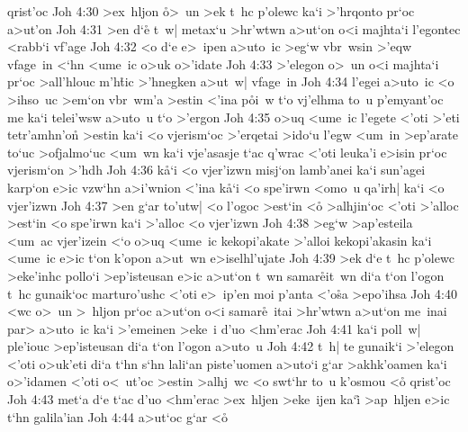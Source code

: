 qrist'oc\bibvsend
\vs Joh 4:30
>ex~hljon
\r{o}>~un
>ek
t~hc
p'olewc
ka`i
>'hrqonto
pr`oc
a>ut'on\bibvsend
\vs Joh 4:31
>en
d`e\r{}
t~w|
metax`u
>hr'wtwn
a>ut`on
o<i
majhta`i
l'egontec
<rabb`i
vf'age\bibvsend
\vs Joh 4:32
<o
d`e
e>~ipen
a>uto~ic
>eg`w
vbr~wsin
>'eqw
vfage~in
<`hn
<ume~ic
o>uk
o>'idate\bibvsend
\vs Joh 4:33
>'elegon
o>~un
o<i
majhta`i
pr`oc
>all'hlouc
m'h\r{t}ic
>'hnegken
a>ut~w|
vfage~in\bibvsend
\vs Joh 4:34
l'egei
a>uto~ic
<o
>ihso~uc
>em`on
vbr~wm'a
>estin
<'ina
p\r{o}i~w
t`o
vj'elhma
to~u
p'emyant'oc
me
ka`i
telei'wsw
a>uto~u
t`o
>'ergon\bibvsend
\vs Joh 4:35
o>uq
<ume~ic
l'egete
<'oti
>'eti
tetr'amhn'o\r{n}
>estin
ka`i
<o
vjerism`oc
>'erqetai
>ido`u
l'egw
<um~in
>ep'arate
to`uc
>ofjalmo`uc
<um~wn
ka`i
vje'asasje
t`ac
q'wrac
<'oti
leuka'i
e>isin
pr`oc
vjerism`on
>'hdh\bibvsend
\vs Joh 4:36
k\r{a}`i
<o
vjer'izwn
misj`on
lamb'anei
ka`i
sun'agei
karp`on
e>ic
vzw`hn
a>i'wnion
<'ina
k\r{a}`i
<o
spe'irwn
<omo~u
qa'irh|
ka`i
<o
vjer'izwn\bibvsend
\vs Joh 4:37
>en
g`ar
to'utw|
<o
l'ogoc
>est`in
<o\r{}
>alhjin`oc
<'oti
>'alloc
>est`in
<o
spe'irwn
ka`i
>'alloc
<o
vjer'izwn\bibvsend
\vs Joh 4:38
>eg`w
>ap'esteila
<um~ac
vjer'izein
<`o
o>uq
<ume~ic
kekopi'akate
>'alloi
kekopi'akasin
ka`i
<ume~ic
e>ic
t`on
k'opon
a>ut~wn
e>iselhl'ujate\bibvsend
\vs Joh 4:39
>ek
d`e
t~hc
p'olewc
>eke'inhc
pollo`i
>ep'isteusan
e>ic
a>ut`on
t~wn
samar\r{e}it~wn
di`a
t`on
l'ogon
t~hc
gunaik`oc
marturo'ushc
<'oti
e>~ip'en
moi
p'anta
<'o\r{s}a
>epo'ihsa\bibvsend
\vs Joh 4:40
<wc
o>~un
>~hljon
pr`oc
a>ut`on
o<i
samar\r{e}~itai
>hr'wtwn
a>ut`on
me~inai
par>
a>uto~ic
ka`i
>'emeinen
>eke~i
d'uo
<hm'erac\bibvsend
\vs Joh 4:41
ka`i
poll~w|
ple'iouc
>ep'isteusan
di`a
t`on
l'ogon
a>uto~u\bibvsend
\vs Joh 4:42
t~h|
te
gunaik`i
>'elegon
<'oti
o>uk'eti
di`a
t`hn
s`hn
lali`an
piste'uomen
a>uto`i
g`ar
>akhk'oamen
ka`i
o>'idamen
<'oti
o<~ut'oc
>estin
>alhj~wc
<o
swt`hr
to~u
k'osmou
<o\r{}
qrist'oc\bibvsend
\vs Joh 4:43
met`a
d`e
t`ac
d'uo
<hm'erac
>ex~hljen
>eke~ijen
ka`i\r{}
>ap~hljen
e>ic
t`hn
galila'ian\bibvsend
\vs Joh 4:44
a>ut`oc
g`ar
<o\r{}
